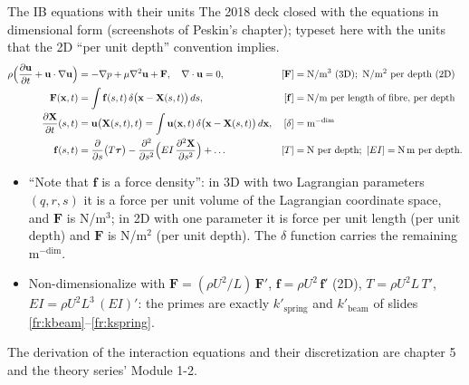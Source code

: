 \documentclass[aspectratio=169,11pt]{beamer}
\begin{document}
\begin{frame}{The IB equations with their units}
\label{fr:ibunits}
\footnotesize The 2018 deck closed with the equations in dimensional form (screenshots of Peskin's chapter); typeset here with the units that the 2D ``per unit depth'' convention implies.
\begingroup\footnotesize
\begin{align*}
  \rho\Bigl(\frac{\partial\mathbf{u}}{\partial t} + \mathbf{u}\cdot\nabla\mathbf{u}\Bigr) &= -\nabla p + \mu\nabla^2\mathbf{u} + \mathbf{F}, \quad \nabla\cdot\mathbf{u} = 0, & [\mathbf{F}] &= \mathrm{N/m^3}\ (3\mathrm{D});\ \mathrm{N/m^2}\ \text{per depth}\ (2\mathrm{D})\\
  \mathbf{F}(\mathbf{x},t) &= \int \mathbf{f}(s,t)\,\delta\bigl(\mathbf{x} - \mathbf{X}(s,t)\bigr)\,ds, & [\mathbf{f}] &= \mathrm{N/m}\ \text{per length of fibre, per depth}\\
  \frac{\partial\mathbf{X}}{\partial t}(s,t) &= \mathbf{u}\bigl(\mathbf{X}(s,t),t\bigr) = \int \mathbf{u}(\mathbf{x},t)\,\delta\bigl(\mathbf{x} - \mathbf{X}(s,t)\bigr)\,d\mathbf{x}, & [\delta] &= \mathrm{m}^{-\mathrm{dim}}\\
  \mathbf{f}(s,t) &= \frac{\partial}{\partial s}\bigl(T\boldsymbol{\tau}\bigr) - \frac{\partial^2}{\partial s^2}\Bigl(EI\,\frac{\partial^2\mathbf{X}}{\partial s^2}\Bigr) + \ldots & [T] &= \mathrm{N}\ \text{per depth};\ [EI] = \mathrm{N\,m}\ \text{per depth}.
\end{align*}
\endgroup
\begin{itemize}\footnotesize
  \item ``Note that $\mathbf{f}$ is a force density'': in 3D with two Lagrangian parameters $(q,r,s)$ it is a force per unit volume of the Lagrangian coordinate space, and $\mathbf{F}$ is N/m$^3$; in 2D with one parameter it is force per unit length (per unit depth) and $\mathbf{F}$ is N/m$^2$ (per unit depth). The $\delta$ function carries the remaining m$^{-\mathrm{dim}}$.
  \item Non-dimensionalize with $\mathbf{F} = (\rho U^2/L)\,\mathbf{F}'$, $\mathbf{f} = \rho U^2\,\mathbf{f}'$ (2D), $T = \rho U^2 L\,T'$, $EI = \rho U^2 L^3\,(EI)'$: the primes are exactly $k'_{\mathrm{spring}}$ and $k'_{\mathrm{beam}}$ of slides \ref{fr:kbeam}--\ref{fr:kspring}.
\end{itemize}
\footnotesize The derivation of the interaction equations and their discretization are chapter 5 and the theory series' Module 1-2.
\end{frame}
\end{document}
